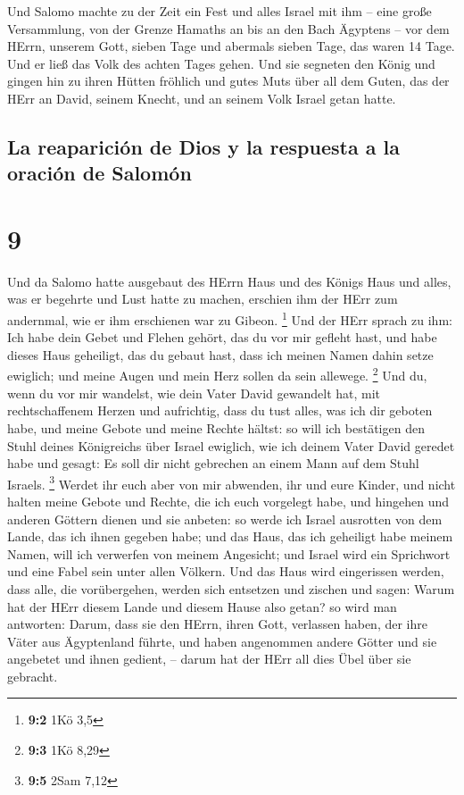  Und Salomo machte zu der Zeit ein Fest und alles Israel
mit ihm -- eine große Versammlung, von der Grenze Hamaths an bis an den
Bach Ägyptens -- vor dem HErrn, unserem Gott, sieben Tage und abermals
sieben Tage, das waren 14 Tage.  Und er ließ das Volk des
achten Tages gehen. Und sie segneten den König und gingen hin zu ihren
Hütten fröhlich und gutes Muts über all dem Guten, das der HErr an
David, seinem Knecht, und an seinem Volk Israel getan hatte.

\hypertarget{la-reapariciuxf3n-de-dios-y-la-respuesta-a-la-oraciuxf3n-de-salomuxf3n}{%
\subsection{La reaparición de Dios y la respuesta a la oración de
Salomón}\label{la-reapariciuxf3n-de-dios-y-la-respuesta-a-la-oraciuxf3n-de-salomuxf3n}}

\hypertarget{section-8}{%
\section{9}\label{section-8}}

 Und da Salomo hatte ausgebaut des HErrn Haus und des
Königs Haus und alles, was er begehrte und Lust hatte zu machen,
 erschien ihm der HErr zum andernmal, wie er ihm
erschienen war zu Gibeon. \footnote{\textbf{9:2} 1Kö 3,5} 
Und der HErr sprach zu ihm: Ich habe dein Gebet und Flehen gehört, das
du vor mir gefleht hast, und habe dieses Haus geheiligt, das du gebaut
hast, dass ich meinen Namen dahin setze ewiglich; und meine Augen und
mein Herz sollen da sein allewege. \footnote{\textbf{9:3} 1Kö 8,29}
 Und du, wenn du vor mir wandelst, wie dein Vater David
gewandelt hat, mit rechtschaffenem Herzen und aufrichtig, dass du tust
alles, was ich dir geboten habe, und meine Gebote und meine Rechte
hältst:  so will ich bestätigen den Stuhl deines
Königreichs über Israel ewiglich, wie ich deinem Vater David geredet
habe und gesagt: Es soll dir nicht gebrechen an einem Mann auf dem Stuhl
Israels. \footnote{\textbf{9:5} 2Sam 7,12}  Werdet ihr
euch aber von mir abwenden, ihr und eure Kinder, und nicht halten meine
Gebote und Rechte, die ich euch vorgelegt habe, und hingehen und anderen
Göttern dienen und sie anbeten:  so werde ich Israel
ausrotten von dem Lande, das ich ihnen gegeben habe; und das Haus, das
ich geheiligt habe meinem Namen, will ich verwerfen von meinem
Angesicht; und Israel wird ein Sprichwort und eine Fabel sein unter
allen Völkern.  Und das Haus wird eingerissen werden, dass
alle, die vorübergehen, werden sich entsetzen und zischen und sagen:
Warum hat der HErr diesem Lande und diesem Hause also getan?
 so wird man antworten: Darum, dass sie den HErrn, ihren
Gott, verlassen haben, der ihre Väter aus Ägyptenland führte, und haben
angenommen andere Götter und sie angebetet und ihnen gedient, -- darum
hat der HErr all dies Übel über sie gebracht.

